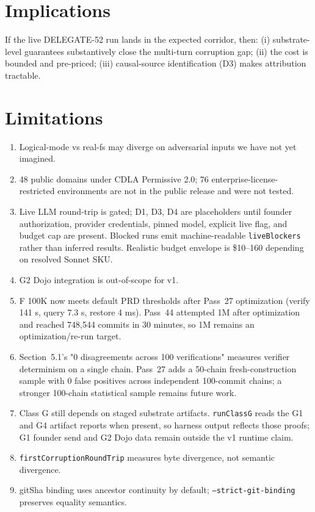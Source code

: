 \documentclass[11pt]{article}
\begin{document}
\section{Implications}

If the live DELEGATE-52 run lands in the expected corridor, then: (i) substrate-level guarantees substantively close the multi-turn corruption gap; (ii) the cost is bounded and pre-priced; (iii) causal-source identification (D3) makes attribution tractable.

\section{Limitations}

\begin{enumerate}
\item Logical-mode vs real-fs may diverge on adversarial inputs we have not yet imagined.
\item 48 public domains under CDLA Permissive 2.0; 76 enterprise-license-restricted environments are not in the public release and were not tested.
\item Live LLM round-trip is gated; D1, D3, D4 are placeholders until founder authorization, provider credentials, pinned model, explicit live flag, and budget cap are present. Blocked runs emit machine-readable \texttt{liveBlockers} rather than inferred results. Realistic budget envelope is \$10--160 depending on resolved Sonnet SKU.
\item G2 Dojo integration is out-of-scope for v1.
\item F 100K now meets default PRD thresholds after Pass~27 optimization (verify 141 s, query 7.3 s, restore 4 ms). Pass~44 attempted 1M after optimization and reached 748{,}544 commits in 30 minutes, so 1M remains an optimization/re-run target.
\item Section~5.1's "0 disagreements across 100 verifications" measures verifier determinism on a single chain. Pass~27 adds a 50-chain fresh-construction sample with 0 false positives across independent 100-commit chains; a stronger 100-chain statistical sample remains future work.
\item Class G still depends on staged substrate artifacts. \texttt{runClassG} reads the G1 and G4 artifact reports when present, so harness output reflects those proofs; G1 founder send and G2 Dojo data remain outside the v1 runtime claim.
\item \texttt{firstCorruptionRoundTrip} measures byte divergence, not semantic divergence.
\item gitSha binding uses ancestor continuity by default; \texttt{--strict-git-binding} preserves equality semantics.
\end{enumerate}
\end{document}
